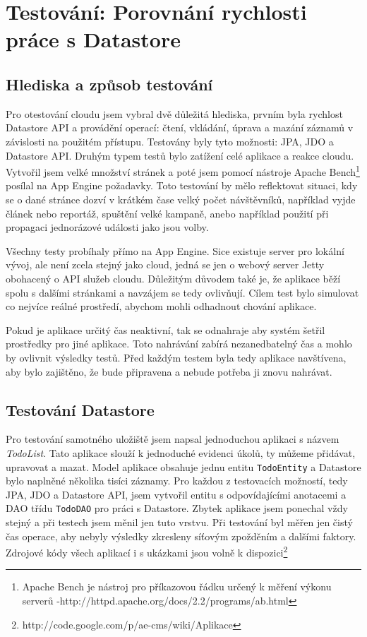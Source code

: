 \chapter{Testování: Porovnání rychlosti práce s Datastore}

\section{Hlediska a způsob testování}
Pro otestování cloudu jsem vybral dvě důležitá hlediska, prvním byla rychlost Datastore API a provádění operací: čtení, vkládání, úprava a mazání záznamů v závislosti na použitém přístupu. Testovány byly tyto možnosti: JPA, JDO a Datastore API. Druhým typem testů bylo zatížení celé aplikace a reakce cloudu. Vytvořil jsem velké množství stránek a poté jsem pomocí nástroje Apache Bench\footnote{Apache Bench je nástroj pro příkazovou řádku určený k měření výkonu serverů -http://httpd.apache.org/docs/2.2/programs/ab.html}  posílal na App Engine požadavky. Toto testování by mělo reflektovat situaci, kdy se o dané stránce dozví v krátkém čase velký počet návštěvníků, například vyjde článek nebo reportáž, spuštění velké kampaně, anebo například použití při propagaci jednorázové události jako jsou volby.

Všechny testy probíhaly přímo na App Engine. Sice existuje server pro lokální vývoj, ale není zcela stejný jako cloud, jedná se jen o webový server Jetty obohacený o API služeb cloudu. Důležitým důvodem také je, že aplikace běží spolu s dalšími stránkami a navzájem se tedy ovlivňují. Cílem test bylo simulovat co nejvíce reálné prostředí, abychom mohli odhadnout chování aplikace.  

Pokud je aplikace určitý čas neaktivní, tak se odnahraje aby systém šetřil prostředky pro jiné aplikace. Toto nahrávání zabírá nezanedbatelný čas a mohlo by ovlivnit výsledky testů. Před každým testem byla tedy aplikace navštívena, aby bylo zajištěno, že bude připravena a nebude potřeba ji znovu nahrávat.

\section{Testování Datastore}
Pro testování samotného uložiště jsem napsal jednoduchou aplikaci s názvem \emph{TodoList}. Tato aplikace slouží k jednoduché evidenci úkolů, ty můžeme přidávat, upravovat a mazat. Model aplikace obsahuje jednu entitu \verb|TodoEntity| a Datastore bylo naplněné několika tisíci záznamy. Pro každou z testovacích možností, tedy JPA, JDO a Datastore API, jsem vytvořil entitu s odpovídajícími anotacemi a DAO třídu \verb|TodoDAO| pro práci s Datastore. Zbytek aplikace jsem ponechal vždy stejný a při testech jsem měnil jen tuto vrstvu. Při testování byl měřen jen čistý čas operace, aby nebyly výsledky zkresleny síťovým zpožděním a dalšími faktory. Zdrojové kódy všech aplikací i s ukázkami jsou volně k dispozici\footnote{http://code.google.com/p/ae-cms/wiki/Aplikace}

